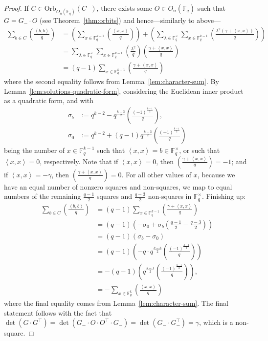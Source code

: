 \documentclass[11pt]{article}
\theoremstyle{definition}
\newcommand{\F}{\mathbb{F}}
\newcommand{\Leg}[2]{\left(\frac{#1}{#2}\right)}                       %
\newcommand{\Orb}{\mathrm{Orb}}
\newcommand{\Ang}[1]{\left\langle#1\right\rangle}
\newcommand{\Ort}{O}
\begin{document}
\begin{proof}
	If $C \in \Orb_{\Ort_n(\F_q)}(C_-)$, there exists some $O \in \Ort_n(\F_q)$ such that $G = G_- \cdot O$ (see Theorem~\ref{thm:orbits}) and hence---similarly to above--- 
	\begin{align*}
		\sum_{b \in C} \Leg{\Ang{b, b}}{q}
		&= \left( \sum_{x \in \F_q^{k - 1}} \Leg{\Ang{x, x}}{q} \right) + \left( \sum_{\lambda \in \F_q^\times} \sum_{x \in \F_q^{k - 1}} \Leg{\lambda^2 (\gamma + \Ang{x, x})}{q} \right) \\
		&= \sum_{\lambda \in \F_q^\times} \sum_{x \in \F_q^{k - 1}} \Leg{\lambda^2}{q} \Leg{\gamma + \Ang{x, x}}{q} \\
		&= (q - 1) \sum_{x \in \F_q^{k - 1}} \Leg{\gamma + \Ang{x, x}}{q}
	\end{align*}
	where the second equality follows from Lemma~\ref{lem:character-sum}.
	By Lemma~\ref{lem:solutions-quadratic-form}, considering the Euclidean inner product as a quadratic form, and with 
	\begin{align*}
		\sigma_b &:= q^{k - 2} - q^{\frac{k - 3}{2}} \Leg{{(-1)}^{\frac{k - 1}{2}}}{q}, \\
		\sigma_0 &:= q^{k - 2} + (q - 1) q^{\frac{k - 3}{2}} \Leg{{(-1)}^{\frac{k - 1}{2}}}{q}
	\end{align*}
	being the number of $x\in\F_q^{k-1}$ such that $\Ang{x, x}=b \in \F_q^\times$, or such that $\Ang{x, x}=0$, respectively.
	Note that if $\Ang{x, x} = 0$, then $\Leg{\gamma + \Ang{x, x}}{q} = -1$; and if $\Ang{x, x} = -\gamma$, then $\Leg{\gamma + \Ang{x, x}}{q} = 0$.
	For all other values of $x$, because we have an equal number of nonzero squares and non-squares, we map to equal numbers of the remaining $\frac{q - 1}{2}$ squares and $\frac{q - 3}{2}$ non-squares in $\F_q^\times$.
	Finishing up:
	\begin{align*}
		\sum_{b \in C} \Leg{\Ang{b, b}}{q}
		&= (q - 1) \sum_{x \in \F_q^{k - 1}} \Leg{\gamma + \Ang{x, x}}{q} \\
		&= (q - 1) (-\sigma_0 + \sigma_b (\frac{q - 1}{2} - \frac{q - 3}{2})) \\
		&= (q - 1) (\sigma_b - \sigma_0) \\
		&= (q - 1) \left(-q \cdot q^{\frac{k - 3}{2}} \Leg{{(-1)}^{\frac{k - 1}{2}}}{q} \right) \\
		&= - (q - 1) \left(q^{\frac{k - 1}{2}} \Leg{{(-1)}^{\frac{k - 1}{2}}}{q} \right), \\
		&= - \sum_{x \in \F_q^k} \Leg{\Ang{x, x}}{q}
	\end{align*}
	where the final equality comes from Lemma~\ref{lem:character-sum}.
	The final statement follows with the fact that $\det(G \cdot G^\top) = \det(G_- \cdot O \cdot O^\top \cdot G_-)= \det(G_- \cdot  G_-^\top) = \gamma$, which is a non-square.
\end{proof}
\end{document}
